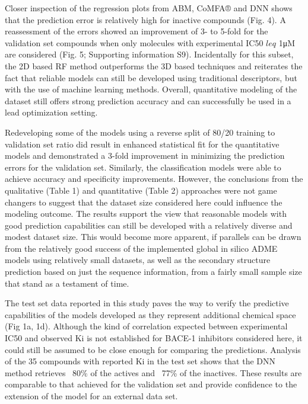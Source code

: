 Closer inspection of the regression plots from ABM, CoMFA® and DNN shows that the prediction error is relatively high for inactive compounds (Fig. 4).  A reassessment of the errors showed an improvement of 3- to 5-fold for the validation set compounds when only molecules with experimental IC50 $leq$ 1μM are considered (Fig. 5; Supporting information S9).  Incidentally for this subset, the 2D based RF method outperforms the 3D based techniques and reiterates the fact that reliable models can still be developed using traditional descriptors, but with the use of machine learning methods.  Overall, quantitative modeling of the dataset still offers strong prediction accuracy and can successfully be used in a lead optimization setting.  

Redeveloping some of the models using a reverse split of 80/20 training to validation set ratio did result in enhanced statistical fit for the quantitative models and demonstrated a 3-fold improvement in minimizing the prediction errors for the validation set.  Similarly, the classification models were able to achieve accuracy and specificity improvements.  However, the conclusions from the qualitative (Table 1) and quantitative (Table 2) approaches were not game changers to suggest that the dataset size considered here could influence the modeling outcome.  The results support the view that reasonable models with good prediction capabilities can still be developed with a relatively diverse and modest dataset size. This would become more apparent, if parallels can be drawn from the relatively good success of the implemented global in silico ADME models using relatively small datasets, as well as the secondary structure prediction based on just the sequence information, from a fairly small sample size that stand as a testament of time.   

The test set data reported in this study paves the way to verify the predictive capabilities of the models developed as they represent additional chemical space (Fig 1a, 1d).  Although the kind of correlation expected between experimental IC50 and observed Ki is not established for BACE-1 inhibitors considered here, it could still be assumed to be close enough for comparing the predictions.  Analysis of the 35 compounds with reported Ki in the test set shows that the DNN method retrieves ~80\% of the actives and ~77\% of the inactives.  These results are comparable to that achieved for the validation set and provide confidence to the extension of the model for an external data set. 

